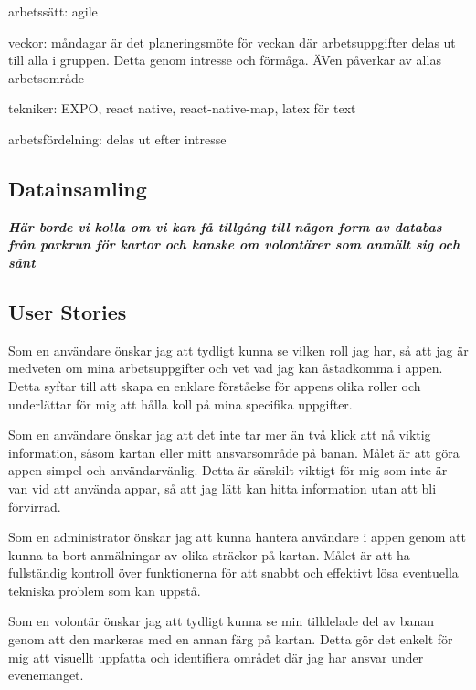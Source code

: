 arbetssätt: agile

veckor: måndagar är det planeringsmöte för veckan där arbetsuppgifter delas ut till alla i gruppen. Detta genom intresse och förmåga. ÄVen påverkar av allas arbetsområde

tekniker: EXPO, react native, react-native-map, latex för text

arbetsfördelning: delas ut efter intresse


\subsection{Datainsamling}

\textbf{\textit{Här borde vi kolla om vi kan få tillgång till någon form av databas från parkrun för kartor och kanske om volontärer som anmält sig och sånt}}

\subsection{User Stories}


Som en användare önskar jag att tydligt kunna se vilken roll jag har, så att jag är medveten om mina arbetsuppgifter och vet vad jag kan åstadkomma i appen. Detta syftar till att skapa en enklare förståelse för appens olika roller och underlättar för mig att hålla koll på mina specifika uppgifter.

\vspace{1em}
Som en användare önskar jag att det inte tar mer än två klick att nå viktig information, såsom kartan eller mitt ansvarsområde på banan. Målet är att göra appen simpel och användarvänlig. Detta är särskilt viktigt för mig som inte är van vid att använda appar, så att jag lätt kan hitta information utan att bli förvirrad.

\vspace{1em}
Som en administrator önskar jag att kunna hantera användare i appen genom att kunna ta bort anmälningar av olika sträckor på kartan. Målet är att ha fullständig kontroll över funktionerna för att snabbt och effektivt lösa eventuella tekniska problem som kan uppstå.

\vspace{1em}
Som en volontär önskar jag att tydligt kunna se min tilldelade del av banan genom att den markeras med en annan färg på kartan. Detta gör det enkelt för mig att visuellt uppfatta och identifiera området där jag har ansvar under evenemanget.

